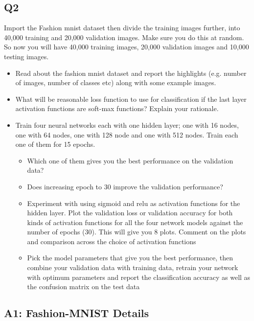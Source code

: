 \documentclass[a4paper, 12pt]{article}
\begin{document}
    \subsection{Q2}

    Import the Fashion mnist dataset then divide the training images further, into 40,000 training and 20,000 validation images. Make sure you do this at random. So now you will have 40,000 training images, 20,000 validation images and 10,000 testing images. 
    
    \begin{itemize}
        \item Read about the fashion mnist dataset and report the highlights (e.g. number of images, number of classes etc) along with some example images.
        \item What will be reasonable loss function to use for classification if the last layer activation functions are soft-max functions? Explain your rationale.
        \item Train four neural networks each with one hidden layer; one with 16 nodes, one with 64 nodes, one with 128 node and one with 512 nodes. Train each one of them for 15 epochs.
        \begin{itemize}
            \item Which one of them gives you the best performance on the validation data?
            \item Does increasing epoch to 30 improve the validation performance?
            \item Experiment with using sigmoid and relu as activation functions for the hidden layer. Plot the validation loss or validation accuracy for both kinds of activation functions for all the four network models against the number of epochs (30). This will give you 8 plots. Comment on the plots and comparison across the choice of activation functions
            \item Pick the model parameters that give you the best performance, then combine your validation data with training data, retrain your network with optimum parameters and report the classification accuracy as well as the confusion matrix on the test data
        \end{itemize}
    \end{itemize}
    
    \subsection{A1: Fashion-MNIST Details}
\end{document}
